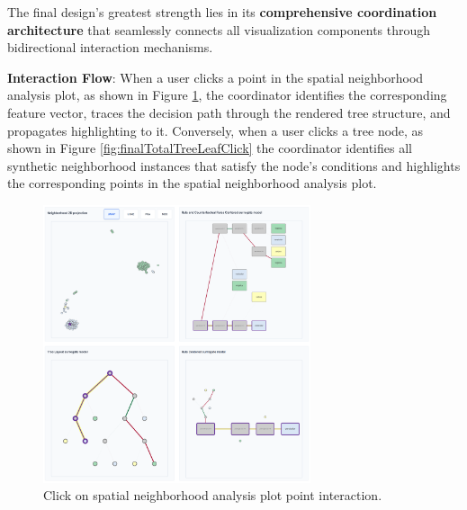The final design's greatest strength lies in its \textbf{comprehensive coordination architecture} that seamlessly connects all visualization components through bidirectional interaction mechanisms.

\textbf{Interaction Flow}: When a user clicks a point in the spatial neighborhood analysis plot, as shown in Figure \ref{fig:finalTotalScatterPointClick}, the coordinator identifies the corresponding feature vector, traces the decision path through the rendered tree structure, and propagates highlighting to it. Conversely, when a user clicks a tree node, as shown in Figure \ref{fig:finalTotalTreeLeafClick} the coordinator identifies all synthetic neighborhood instances that satisfy the node's conditions and highlights the corresponding points in the spatial neighborhood analysis plot.

\begin{figure}[ht]
  \centering
  \includegraphics[width=0.7\textwidth]{images/FullInterfaceFinalLeadInteractionScatter.png}
  \caption{Click on spatial neighborhood analysis plot point interaction.}
  \label{fig:finalTotalScatterPointClick}
\end{figure}

